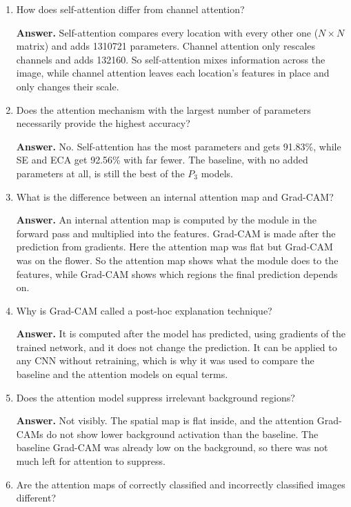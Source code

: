 \documentclass[10pt]{article}
\begin{document}
\begin{enumerate}
\item How does self-attention differ from channel attention?

\textbf{Answer.} Self-attention compares every location with every other one ($N\times N$ matrix) and adds 1310721 parameters. Channel attention only rescales channels and adds 132160. So self-attention mixes information across the image, while channel attention leaves each location's features in place and only changes their scale.

\item Does the attention mechanism with the largest number of parameters necessarily provide the highest accuracy?

\textbf{Answer.} No. Self-attention has the most parameters and gets 91.83\%, while SE and ECA get 92.56\% with far fewer. The baseline, with no added parameters at all, is still the best of the $P_3$ models.

\item What is the difference between an internal attention map and Grad-CAM?

\textbf{Answer.} An internal attention map is computed by the module in the forward pass and multiplied into the features. Grad-CAM is made after the prediction from gradients. Here the attention map was flat but Grad-CAM was on the flower. So the attention map shows what the module does to the features, while Grad-CAM shows which regions the final prediction depends on.

\item Why is Grad-CAM called a post-hoc explanation technique?

\textbf{Answer.} It is computed after the model has predicted, using gradients of the trained network, and it does not change the prediction. It can be applied to any CNN without retraining, which is why it was used to compare the baseline and the attention models on equal terms.

\item Does the attention model suppress irrelevant background regions?

\textbf{Answer.} Not visibly. The spatial map is flat inside, and the attention Grad-CAMs do not show lower background activation than the baseline. The baseline Grad-CAM was already low on the background, so there was not much left for attention to suppress.

\item Are the attention maps of correctly classified and incorrectly classified images different?


\end{enumerate}
\end{document}
